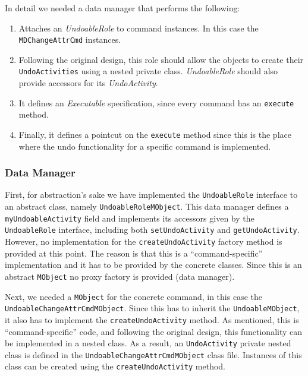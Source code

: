In detail we needed a data manager that performs the following:
\begin{enumerate}
	
	\item Attaches an \textit{UndoableRole} to command instances.
	In this case the \texttt{MDChangeAttrCmd} instances.

	\item Following the original design, this role should allow the objects to create their \texttt{UndoActivities} using a nested private class.
	\textit{UndoableRole} should also provide accessors for its \textit{UndoActivity}.

	\item It defines an \textit{Executable} specification, since every command has an \texttt{execute} method.

	\item Finally, it defines a pointcut on the \texttt{execute} method since this is the place where the undo functionality for a specific command is implemented.

\end{enumerate}

\subsubsection{Data Manager}
First, for abstraction's sake we have implemented the \texttt{UndoableRole} interface to an abstract class, namely \texttt{UndoableRoleMObject}.
This data manager defines a \texttt{myUndoableActivity} field and implements its accessors given by the \texttt{UndoableRole} interface, including both \texttt{setUndoActivity} and \texttt{getUndoActivity}.
However, no implementation for the \texttt{createUndoActivity} factory method is provided at this point.
The reason is that this is a ``command-specific'' implementation and it has to be provided by the concrete classes.
Since this is an abstract \texttt{MObject} no proxy factory is provided (data manager).

Next, we needed a \texttt{MObject} for the concrete command, in this case the \texttt{UndoableChangeAttrCmdMObject}.
Since this has to inherit the \texttt{UndoableMObject}, it also has to implement the \texttt{createUndoActivity} method.
As mentioned, this is ``command-specific'' code, and following the original design, this functionality can be implemented in a nested class.
As a result, an \texttt{UndoActivity} private nested class is defined in the \texttt{UndoableChangeAttrCmdMObject} class file.
Instances of this class can be created using the \texttt{createUndoActivity} method.

